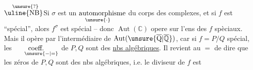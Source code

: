 \(\overset{\hspace{0.55em}\unsure{?}}{\text{\uline{NB}}}\)\quad Si $\sigma$ est un $\underset{\hspace{-1.3em}\unsure{\cdot}}{\text{automorphisme}}$ du corps des complexes, et si $f$ est ``spécial'', alors $f^\sigma$ est  spécial -- donc $\operatorname{Aut}(\mathbb C)$ opere sur l'ens des $f$ spèciaux. Mais il opère par l'intermédiaire de $\operatorname{Aut}(\unsure{\overline{\mathrm Q}|\overline{\mathbb Q}})$, car si $f=P/Q$ spécial, les $\underset{\hspace{1.5em}\unsure{-|=}}{\text{coeff.}}$ de $P,Q$ sont des \uline{nbs algébriques}. Il revient au $=$ de dire que les zéros de $P,Q$ sont des nbs algébriques, i.e. le diviseur de $f$ est


